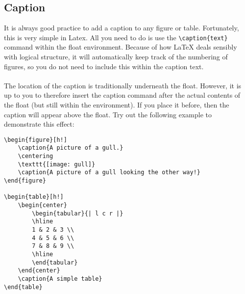 \documentclass[a4paper, 12pt, oneside]{report}
\begin{document}
\subsection{Caption}
It is always good practice to add a caption to any figure or table. Fortunately, this is very simple in Latex. All you need to do is use the \verb|\caption{text}| command within the float environment. Because of how LaTeX deals sensibly with logical structure, it will automatically keep track of the numbering of figures, so you do not need to include this within the caption text.\\
\\
The location of the caption is traditionally underneath the float. However, it is up to you to therefore insert the caption command after the actual contents of the float (but still within the environment). If you place it before, then the caption will appear above the float. Try out the following example to demonstrate this effect:
\begin{verbatim}
\begin{figure}[h!]
    \caption{A picture of a gull.}
    \centering
    \texttt{[image: gull]}
    \caption{A picture of a gull looking the other way!}
\end{figure}
  
\begin{table}[h!]
    \begin{center}
        \begin{tabular}{| l c r |}
        \hline
        1 & 2 & 3 \\
        4 & 5 & 6 \\
        7 & 8 & 9 \\
        \hline
        \end{tabular}
    \end{center}
    \caption{A simple table}
\end{table}

\end{verbatim}
\end{document}

